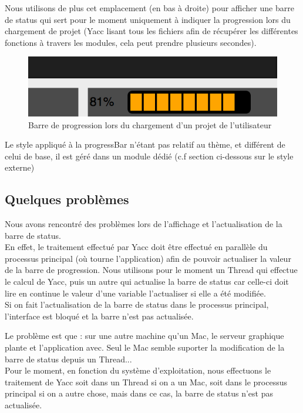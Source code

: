 \documentclass[a4paper,12pt]{article}
\begin{document}
		Nous utilisons de plus cet emplacement (en bas à droite) pour afficher une barre de status qui sert pour le moment uniquement à indiquer la progression lors du chargement de projet (Yacc lisant tous les fichiers afin de récupérer les différentes fonctions à travers les modules, cela peut prendre plusieurs secondes).
		\begin{figure}[h!]
			\begin{center}
				\includegraphics[scale=1]{imgs/progress}
				\caption{Barre de progression lors du chargement d'un projet de l'utilisateur}
			\end{center}
		\end{figure}
		
		Le style appliqué à la progressBar n'étant pas relatif au thème, et différent de celui de base, il est géré dans un module dédié (c.f section ci-dessous sur le style externe)
		
		\subsection*{Quelques problèmes}
		
			Nous avons rencontré des problèmes lors de l'affichage et l'actualisation de la barre de status.\\
			
			En effet, le traitement effectué par Yacc doit être effectué en parallèle du processus principal (où tourne l'application) afin de pouvoir actualiser la valeur de la barre de progression. Nous utilisons pour le moment un Thread qui effectue le calcul de Yacc, puis un autre qui actualise la barre de status car celle-ci doit lire en continue le valeur d'une variable l'actualiser si elle a été modifiée.\\
			 Si on fait l'actualisation de la barre de status dans le processus principal, l'interface est bloqué et la barre n'est pas actualisée.
			 
			 Le problème est que : sur une autre machine qu'un Mac, le serveur graphique plante et l'application avec. Seul le Mac semble suporter la modification de la barre de status depuis un Thread...\\
			 Pour le moment, en fonction du système d'exploitation, nous effectuons le traitement de Yacc soit dans un Thread si on a un Mac, soit dans le processus principal si on a autre chose, mais dans ce cas, la barre de status n'est pas actualisée.
			 
\end{document}
